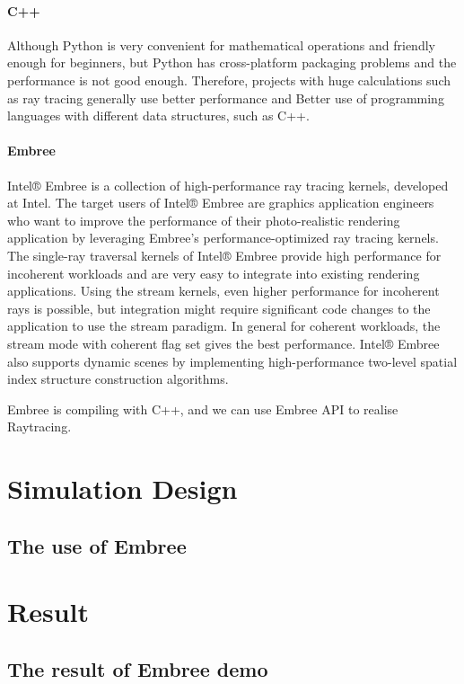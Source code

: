 \documentclass[conference]{IEEEtran}
\begin{document}
\paragraph{C++}
Although Python is very convenient for mathematical operations and friendly enough for beginners, but
Python has cross-platform packaging problems and the performance is not good enough. 
Therefore, projects with huge calculations such as ray tracing generally use better performance 
and Better use of programming languages with different data structures, such as C++.

\paragraph{Embree}
Intel® Embree is a collection of high-performance ray tracing kernels, developed at Intel. 
The target users of Intel® Embree are graphics application engineers who want to improve the 
performance of their photo-realistic rendering application by leveraging Embree's performance-optimized ray tracing kernels. 
The single-ray traversal kernels of Intel® Embree provide high performance for incoherent workloads and are very easy to integrate into existing rendering applications.
Using the stream kernels, even higher performance for incoherent rays is possible, but integration might require significant code changes to the application to use the stream paradigm. 
In general for coherent workloads, the stream mode with coherent flag set gives the best performance.
Intel® Embree also supports dynamic scenes by implementing high-performance two-level spatial index structure construction algorithms. \cite{Intel_Embree}

Embree is compiling with C++, and we can use Embree API to realise Raytracing.
\section{Simulation Design}
\subsection{The use of Embree}
\section{Result}
\subsection{The result of Embree demo}






\end{document}
